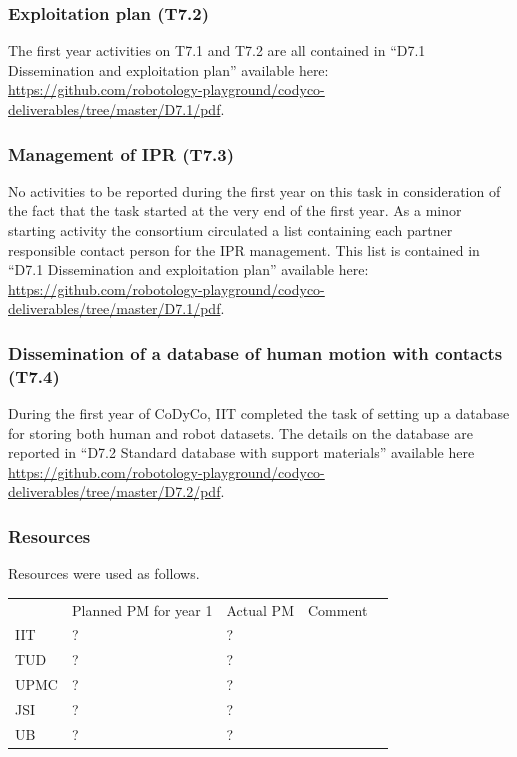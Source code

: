 \documentclass[12pt,a4paper,twoside]{article}
\begin{document}
\subsubsection{Exploitation plan (T7.2)}

The first year activities on T7.1 and T7.2 are all contained in ``D7.1 Dissemination and exploitation plan'' available here: \url{https://github.com/robotology-playground/codyco-deliverables/tree/master/D7.1/pdf}.

\subsubsection{Management of IPR (T7.3)}

No activities to be reported during the first year on this task in consideration of the fact that the task started at the very end of the first year. As a minor starting activity the consortium circulated a list containing each partner responsible contact person for the IPR management. This list is contained in ``D7.1 Dissemination and exploitation plan'' available here: \url{https://github.com/robotology-playground/codyco-deliverables/tree/master/D7.1/pdf}.

\subsubsection{Dissemination of a database of human motion with contacts (T7.4)}

During the first year of CoDyCo, IIT completed the task of setting up a database for storing both human and robot datasets. The details on the database are reported in ``D7.2 Standard database with support materials'' available here \url{https://github.com/robotology-playground/codyco-deliverables/tree/master/D7.2/pdf}. 

\subsubsection{Resources}

Resources were used as follows.

\begin{center}
\begin{tabular}{|l|l|l|l|l}
\cline{1-4}
 & Planned PM for year 1 & Actual PM & Comment & \\ \cline{1-4}
IIT        & ? & ? &  &  \\ \cline{1-4}
TUD    & ? & ? &  &  \\ \cline{1-4}
UPMC & ? & ? &  &  \\ \cline{1-4}
JSI       & ? & ? &  &  \\ \cline{1-4}
UB       & ? & ? &  &  \\ \cline{1-4}
\end{tabular}
\end{center}
\end{document}
